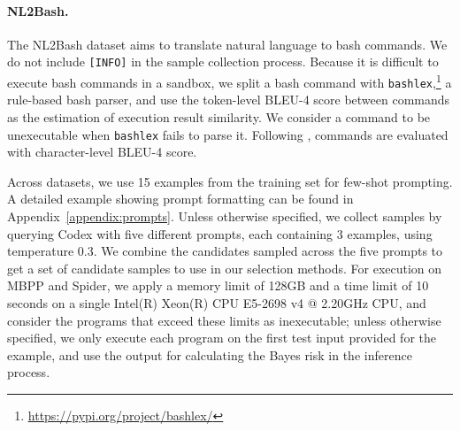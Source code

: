 \documentclass[11pt]{article}
\begin{document}
\paragraph{NL2Bash.} 
The NL2Bash dataset \citep{lin-etal-2018-nl2bash} aims to translate natural language to bash commands. We do not include \texttt{[INFO]} in the sample collection process. Because it is difficult to execute bash commands in a sandbox, we split a bash command with \texttt{bashlex},\footnote{\url{https://pypi.org/project/bashlex/}} a rule-based bash parser, and use the token-level BLEU-4 score between commands as the estimation of execution result similarity. We consider a command to be unexecutable when \texttt{bashlex} fails to parse it. Following \citet{lin-etal-2018-nl2bash}, commands are evaluated with character-level BLEU-4 score.

Across datasets, we use 15 examples from the training set for few-shot prompting. A detailed example showing prompt formatting can be found in Appendix~\ref{appendix:prompts}. Unless otherwise specified, we collect samples by querying Codex with five different prompts, each containing 3 examples, using temperature 0.3. We combine the candidates sampled across the five prompts to get a set of candidate samples to use in our selection methods. For execution on MBPP and Spider, we apply a memory limit of 128GB and a time limit of 10 seconds on a single Intel(R) Xeon(R) CPU E5-2698 v4 @ 2.20GHz CPU, and consider the programs that exceed these limits as inexecutable; unless otherwise specified, we only execute each program on the first test input provided for the example, and use the output for calculating the Bayes risk in the inference process. 
\end{document}
